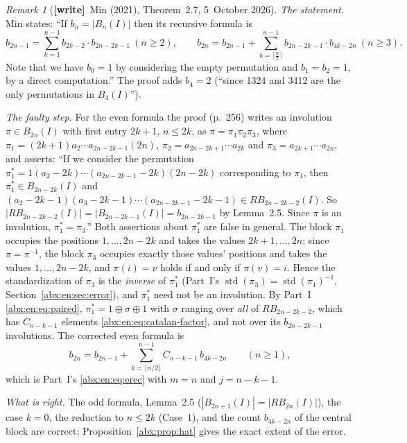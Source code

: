 \documentclass[11pt,letterpaper]{article}
\numberwithin{equation}{section}
\theoremstyle{remark}\newtheorem{remark}[theorem]{Remark}
\newcommand{\std}{\operatorname{std}}
\newcommand{\wtag}{\textup{\textbf{[write]}}}
\begin{document}
\begin{remark}[\wtag\ Min (2021), Theorem~2.7, 5~October 2026]\label{abx:rem:min}
\emph{The statement.} Min \cite[p.~255]{min2021} states: ``If $b_n=|B_n(I)|$ then its recursive formula is
\[
 b_{2n-1}=\sum_{k=1}^{n-1}b_{2k-2}\cdot b_{2n-2k-1}\ (n\ge2),\qquad
 b_{2n}=b_{2n-1}+\sum_{k=\lceil\frac n2\rceil}^{n-1}b_{2n-2k-1}\cdot b_{4k-2n}\ (n\ge3).
\]
Note that we have $b_0=1$ by considering the empty permutation and $b_1=b_2=1$, by a direct computation.'' The proof adds $b_4=2$ (``since 1324 and 3412 are the only permutations in $B_4(I)$'').

\emph{The faulty step.} For the even formula the proof (p.~256) writes an involution $\pi\in B_{2n}(I)$ with first entry $2k+1$, $n\le2k$, as $\pi=\pi_1\pi_2\pi_3$, where $\pi_1=(2k+1)a_2\cdots a_{2n-2k-1}(2n)$, $\pi_2=a_{2n-2k+1}\cdots a_{2k}$ and $\pi_3=a_{2k+1}\cdots a_{2n}$, and asserts: ``If we consider the permutation $\pi_1^*=1(a_2-2k)\cdots(a_{2n-2k-1}-2k)(2n-2k)$ corresponding to $\pi_1$, then $\pi_1^*\in B_{2n-2k}(I)$ and $(a_2-2k-1)(a_3-2k-1)\cdots(a_{2n-2k-1}-2k-1)\in RB_{2n-2k-2}(I)$. So $|RB_{2n-2k-2}(I)|=|B_{2n-2k-1}(I)|=b_{2n-2k-1}$ by Lemma~2.5. Since $\pi$ is an involution, $\pi_1^*=\pi_3$.'' Both assertions about $\pi_1^*$ are false in general. The block $\pi_1$ occupies the positions $1,\ldots,2n-2k$ and takes the values $2k+1,\ldots,2n$; since $\pi=\pi^{-1}$, the block $\pi_3$ occupies exactly those values' positions and takes the values $1,\ldots,2n-2k$, and $\pi(i)=v$ holds if and only if $\pi(v)=i$. Hence the standardization of $\pi_3$ is the \emph{inverse} of $\pi_1^*$ (Part~I's $\std(\pi_3)=\std(\pi_1)^{-1}$, Section~\ref{abx:en:sec:error}), and $\pi_1^*$ need not be an involution. By Part~I \eqref{abx:en:eq:paired}, $\pi_1^*=1\oplus\sigma\oplus1$ with $\sigma$ ranging over \emph{all} of $RB_{2n-2k-2}$, which has $C_{n-k-1}$ elements \eqref{abx:en:eq:catalan-factor}, and not over its $b_{2n-2k-1}$ involutions. The corrected even formula is
\[
 b_{2n}=b_{2n-1}+\sum_{k=\lceil n/2\rceil}^{n-1}C_{n-k-1}\,b_{4k-2n}\qquad(n\ge1),
\]
which is Part~I's \eqref{abx:en:eq:erec} with $m=n$ and $j=n-k-1$.

\emph{What is right.} The odd formula, Lemma~2.5 ($|B_{2n+1}(I)|=|RB_{2n}(I)|$), the case $k=0$, the reduction to $n\le2k$ (Case~1), and the count $b_{4k-2n}$ of the central block are correct; Proposition~\ref{abx:prop:hat} gives the exact extent of the error.
\end{remark}
\end{document}
